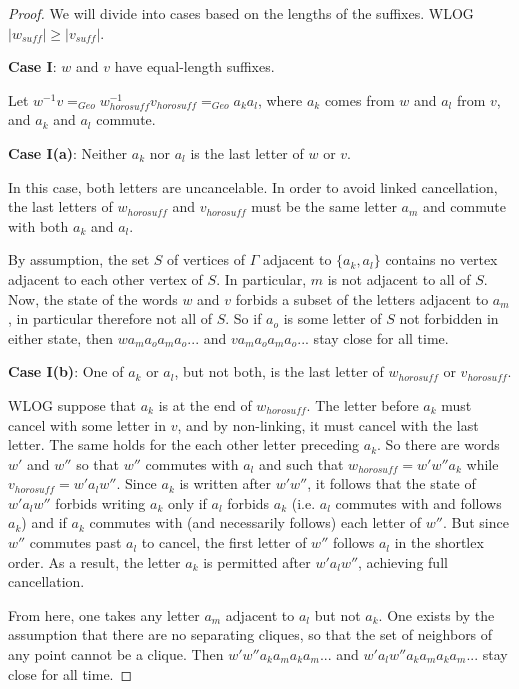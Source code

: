 \documentclass[10pt,a4paper]{amsart}
\theoremstyle{definition}
\theoremstyle{remark}
\begin{document}
	\begin{proof}
		
		We will divide into cases based on the lengths of the suffixes. \newline WLOG $|w_{suff}|\ge |v_{suff}|$.
		
		\textbf{Case I}: $w$ and $v$ have equal-length suffixes.
		
		Let $w^{-1}v=_{Geo}w_{horosuff}^{-1}v_{horosuff}=_{Geo}a_ka_l$, where $a_k$ comes from $w$ and $a_l$ from $v$, and $a_k$ and $a_l$ commute.
		
		\textbf{Case I(a)}: Neither $a_k$ nor $a_l$ is the last letter of $w$ or $v$.
		
		In this case, both letters are uncancelable. In order to avoid linked cancellation, the last letters of $w_{horosuff}$ and $v_{horosuff}$ must be the same letter $a_m$ and commute with both $a_k$ and $a_l$.
		
		By assumption, the set $S$ of vertices of $\Gamma$ adjacent to $\{a_k, a_l\}$ contains no vertex adjacent to each other vertex of $S$. In particular, $m$ is not adjacent to all of $S$. Now, the state of the words $w$ and $v$ forbids a subset of the letters adjacent to $a_m$, in particular therefore not all of $S$. So if $a_o$ is some letter of $S$ not forbidden in either state, then $wa_ma_oa_ma_o...$ and $va_ma_oa_ma_o...$ stay close for all time.
		
		\textbf{Case I(b)}: One of $a_k$ or $a_l$, but not both, is the last letter of $w_{horosuff}$ or $v_{horosuff}$.
		
		WLOG suppose that $a_k$ is at the end of $w_{horosuff}$. The letter before $a_k$ must cancel with some letter in $v$, and by non-linking, it must cancel with the last letter. The same holds for the each other letter preceding $a_k$. So there are words $w'$ and $w''$ so that $w''$ commutes with $a_l$ and such that $w_{horosuff} = w'w''a_k$ while $v_{horosuff}=w'a_lw''$. Since $a_k$ is written after $w'w''$, it follows that the state of $w'a_lw''$ forbids writing $a_k$ only if $a_l$ forbids $a_k$ (i.e. $a_l$ commutes with and follows $a_k$) and if $a_k$ commutes with (and necessarily follows) each letter of $w''$. But since $w''$ commutes past $a_l$ to cancel, the first letter of $w''$ follows $a_l$ in the shortlex order. As a result, the letter $a_k$ is permitted after $w'a_lw''$, achieving full cancellation.
		
		From here, one takes any letter $a_m$ adjacent to $a_l$ but not $a_k$. One exists by the assumption that there are no separating cliques, so that the set of neighbors of any point cannot be a clique. Then $w'w''a_ka_ma_ka_m...$ and $w'a_lw''a_ka_ma_ka_m...$ stay close for all time.
		

\end{proof}
\end{document}
